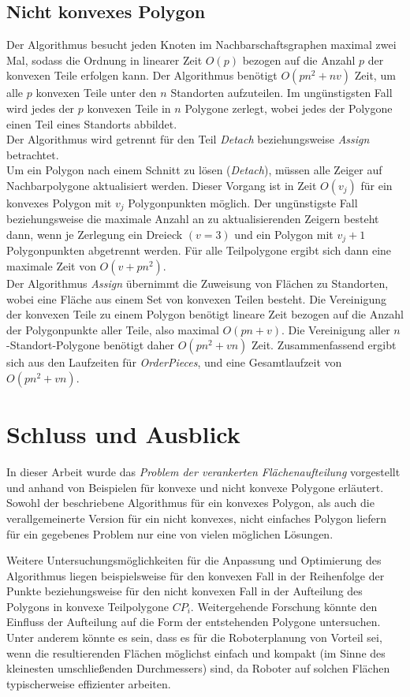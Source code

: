\documentclass[ngerman]{seminarbeitrag}
\begin{document}
\subsection{Nicht konvexes Polygon}
Der Algorithmus \ord besucht jeden Knoten im Nachbarschaftsgraphen maximal zwei Mal, sodass die Ordnung in linearer Zeit $O(p)$ bezogen auf die Anzahl $p$ der konvexen Teile erfolgen kann.
Der Algorithmus \noncon benötigt $O(pn^{2} + nv)$ Zeit, um alle $p$ konvexen Teile unter den $n$ Standorten aufzuteilen. Im ungünstigsten Fall wird jedes der $p$ konvexen Teile in $n$ Polygone zerlegt, wobei jedes der Polygone einen Teil eines Standorts abbildet.\\
Der Algorithmus \daa wird getrennt für den Teil \emph{Detach} beziehungsweise \emph{Assign} betrachtet.\\
Um ein Polygon nach einem Schnitt zu lösen (\emph{Detach}), müssen alle Zeiger auf Nachbarpolygone aktualisiert werden. Dieser Vorgang ist in Zeit $O(v_{j})$ für ein konvexes Polygon mit $v_{j}$ Polygonpunkten möglich. Der ungünstigste Fall beziehungsweise die maximale Anzahl an zu aktualisierenden Zeigern besteht dann, wenn je Zerlegung ein Dreieck $(v=3)$ und ein Polygon mit $v_{j}+1$ Polygonpunkten abgetrennt werden. Für alle Teilpolygone ergibt sich dann eine maximale Zeit von $O(v + pn^{2})$.\\
Der Algorithmus \emph{Assign} übernimmt die Zuweisung von Flächen zu Standorten, wobei eine Fläche aus einem Set von konvexen Teilen besteht. Die Vereinigung der konvexen Teile zu einem Polygon benötigt lineare Zeit bezogen auf die Anzahl der Polygonpunkte aller Teile, also maximal $O(pn + v)$. Die Vereinigung aller $n$-Standort-Polygone benötigt daher $O(pn^{2}+ vn)$ Zeit. 
Zusammenfassend ergibt sich aus den Laufzeiten für \mbox{\textit{OrderPieces}}, \noncon und \daa eine Gesamtlaufzeit von $O(pn^{2} + vn)$.

\section{Schluss und Ausblick}\label{schluss}
In dieser Arbeit wurde das \emph{Problem der verankerten Flächenaufteilung} vorgestellt und anhand von Beispielen für konvexe und nicht konvexe Polygone erläutert.
Sowohl der beschriebene Algorithmus für ein konvexes Polygon, als auch die verallgemeinerte Version für ein nicht konvexes, nicht einfaches Polygon liefern für ein gegebenes Problem nur eine von vielen möglichen Lösungen.

Weitere Untersuchungsmöglichkeiten für die Anpassung und Optimierung des Algorithmus liegen beispielsweise für den konvexen Fall in der Reihenfolge der Punkte beziehungsweise für den nicht konvexen Fall in der Aufteilung des Polygons in konvexe Teilpolygone $CP_{i}$. Weitergehende Forschung könnte den Einfluss der Aufteilung auf die Form der entstehenden Polygone untersuchen. Unter anderem könnte es sein, dass es für die Roboterplanung von Vorteil sei, wenn die resultierenden Flächen möglichst einfach und kompakt (im Sinne des kleinesten umschließenden Durchmessers) sind, da Roboter auf solchen Flächen typischerweise effizienter arbeiten.
\end{document}
